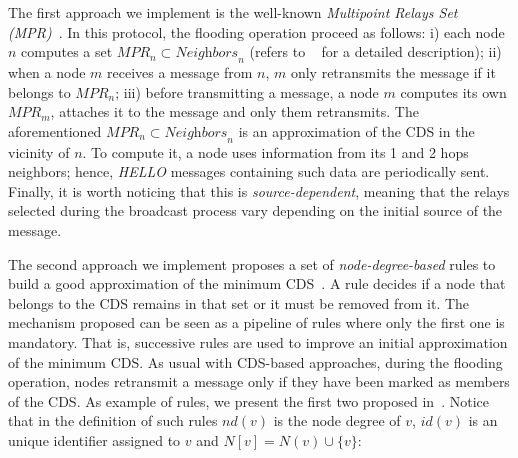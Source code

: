 The first approach we implement is the well-known \textit{Multipoint Relays Set (MPR)}~\cite{Qayyum2002}.
In this protocol, the flooding operation proceed as follows: i) each node $n$ computes a set $\textit{MPR}_n \subset \textit{Neighbors}_n$ (refers to ~\cite{Qayyum2002} for a detailed description); ii) when a node $m$ receives a message from $n$, $m$ only retransmits the message if it belongs to $\textit{MPR}_n$; iii) before transmitting a message, a node $m$ computes its own $\textit{MPR}_m$, attaches it to the message and only them retransmits.
The aforementioned $\textit{MPR}_n \subset \textit{Neighbors}_n$ is an approximation of the CDS in the vicinity of $n$.
To compute it, a node uses information from its 1 and 2 hops neighbors; hence, \textit{HELLO} messages containing such data are periodically sent.
Finally, it is worth noticing that this is \textit{source-dependent}, meaning that the relays selected during the broadcast process vary depending on the initial source of the message.




The second approach we implement proposes a set of \textit{node-degree-based} rules to build a good approximation of the minimum CDS~\cite{Wu2001}.
A rule decides if a node that belongs to the CDS remains in that set or it must be removed from it.  
The mechanism proposed can be seen as a pipeline of rules where only the first one is mandatory.
That is, successive rules are used to improve an initial approximation of the minimum CDS.
As usual with CDS-based approaches, during the flooding operation, nodes retransmit a message only if they have been marked as members of the CDS.
As example of rules, we present the first two proposed in~\cite{Wu2001}.
Notice that in the definition of such rules $\textit{nd}(v)$ is the node degree of $v$, $\textit{id}(v)$ is an unique identifier assigned to $v$ and $N\left[v\right] = N(v) \cup \lbrace v \rbrace$:


